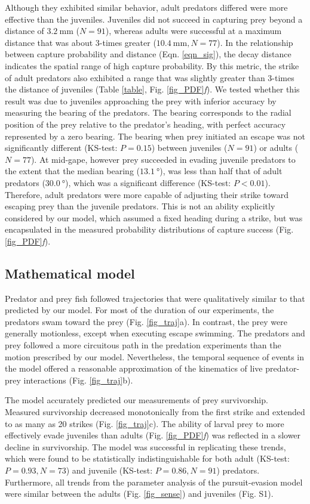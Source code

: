 \documentclass[]{rsos}%
\begin{document}
Although they exhibited similar behavior, adult predators differed were more effective than the juveniles.
Juveniles did not succeed in capturing prey beyond a distance of $\SI{3.2}{\mm}$ ($N = 91$), whereas adults were successful at a maximum distance that was about 3-times greater ($\SI{10.4}{\mm}, N = 77$).
In the relationship between capture probability and distance (Eqn. \ref{eqn_sig}), the decay distance indicates the spatial range of high capture probability. 
By this metric, the strike of adult predators also exhibited a range that was slightly greater than 3-times the distance of juveniles (Table \ref{table}, Fig. \ref{fig_PDF}\textit{f}).
We tested whether this result was due to juveniles approaching the prey with inferior accuracy by measuring the bearing of the predators.
The bearing corresponds to the radial position of the prey relative to the predator's heading, with perfect accuracy represented by a zero bearing.
The bearing when prey initiated an escape was not significantly different (KS-test: $P = 0.15$) between juveniles ($N = 91$) or adults ($N = 77$).
At mid-gape, however prey succeeded in evading juvenile predators to the extent that the median bearing ($\SI{13.1}{\degree}$), was less than half that of adult predators ($\SI{30.0}{\degree}$), which was a significant difference (KS-test: $P < 0.01$).
Therefore, adult predators were more capable of adjusting their strike toward escaping prey than the juvenile predators. 
This is not an ability explicitly considered by our model, which assumed a fixed heading during a strike, but was encapsulated in the measured probability distributions of capture success (Fig. \ref{fig_PDF}\textit{f}).

\subsection{Mathematical model} %
Predator and prey fish followed trajectories that were qualitatively similar to that predicted by our model.
For most of the duration of our experiments, the predators swam toward the prey (Fig. \ref{fig_traj}a). 
In contrast, the prey were generally motionless, except  when executing escape swimming.
The predators and prey followed a more circuitous path in the predation experiments than the motion prescribed by our model.
Nevertheless, the temporal sequence of events in the model offered a reasonable approximation of the kinematics of live predator-prey interactions (Fig. \ref{fig_traj}b).

The model accurately predicted our measurements of prey survivorship. 
Measured survivorship decreased monotonically from the first strike and extended to as many as 20 strikes (Fig. \ref{fig_traj}c).
The ability of larval prey to more effectively evade juveniles than adults (Fig. \ref{fig_PDF}\textit{f}) was reflected in a slower decline in survivorship.
The model was successful in replicating these trends, which were found to be statistically indistinguishable for both adult (KS-test: $P = 0.93, N = 73$) and juvenile (KS-test: $P = 0.86, N = 91$) predators. 
Furthermore, all trends from the parameter analysis of the pursuit-evasion model were similar between the adults (Fig. \ref{fig_sense}) and juveniles (Fig. S1). 
\end{document}
